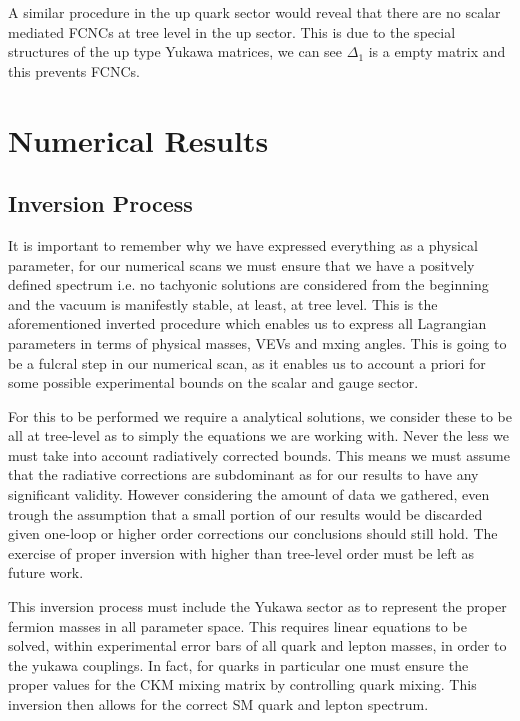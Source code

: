 A similar procedure in the up quark sector would reveal that there are no scalar mediated FCNCs at tree level in
the up sector. 
%
This is due to the special structures of the up type Yukawa matrices, we can see $\Delta_1$ is a empty matrix and this prevents FCNCs.

\section{Numerical Results}

\subsection{Inversion Process}

It is important to remember why we have expressed everything as a physical parameter, for our numerical scans we must ensure that we have a positvely defined spectrum i.e. no tachyonic solutions are considered from the beginning and the vacuum is manifestly stable, at least, at tree level.
%
This is the aforementioned inverted procedure which enables us to express all Lagrangian parameters in terms of physical masses, VEVs and mxing angles. 
% 
This is going to be a fulcral step in our numerical scan, as it enables us to account a priori for some possible experimental bounds on the scalar and gauge sector. 

For this to be performed we require a analytical solutions, we consider these to be all at tree-level as to simply the equations we are working with. Never the less we must take into account radiatively corrected bounds. This means we must assume that the radiative corrections are subdominant as for our results to have any significant validity. However considering the amount of data we gathered, even trough the assumption that a small portion of our results would be discarded given one-loop or higher order corrections our conclusions should still hold. The exercise of proper inversion with higher than tree-level order must be left as future work.  

This inversion process must include the Yukawa sector as to represent the proper fermion masses in all parameter space. This requires linear equations to be solved, within experimental error bars of all quark and lepton masses, in order to the yukawa couplings.  
% 
In fact, for quarks in particular one must ensure the proper values for the CKM mixing matrix by controlling quark mixing. This inversion then allows for the correct SM quark and lepton spectrum. 

